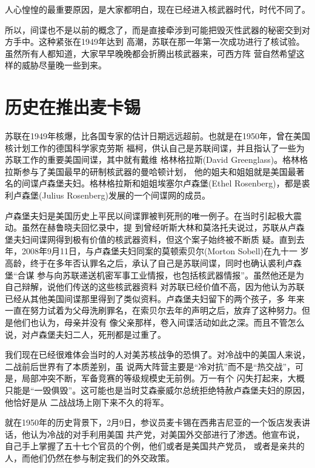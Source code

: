 \documentclass[10pt]{article}
\begin{document}
{人心惶惶的最重要原因，是大家都明白，现在已经进入核武器时代，时代不同了。

所以，间谍也不是以前的概念了，而是直接牵涉到可能把毁灭性武器的秘密交到对方手中。这种紧张在1949年达到
高潮，苏联在那一年第一次成功进行了核试验。虽然所有人都知道，大家早早晚晚都会折腾出核武器来，可西方阵
营自然希望这样的威胁尽量晚一些到来。

\pagebreak
\section{历史在推出麦卡锡}

苏联在1949年核爆，比各国专家的估计日期远远超前。也就是在1950年，曾在美国核计划工作的德国科学家克劳斯
\textperiodcentered 福柯，供认自己是苏联间谍，并且指认了一些为苏联工作的重要美国间谍，其中就有戴维
\textperiodcentered 格林格拉斯(David Greenglass)。格林格拉斯参与了美国最早的研制核武器的曼哈顿计划，
他的姐夫和姐姐就是美国最著名的间谍卢森堡夫妇。格林格拉斯和姐姐埃塞尔\textperiodcentered 卢森堡(Ethel
Rosenberg)，都是裘利\textperiodcentered 卢森堡(Julius Rosenberg)发展的一个间谍网的成员。

卢森堡夫妇是美国历史上平民以间谍罪被判死刑的唯一例子。在当时引起极大震动。虽然在赫鲁晓夫回忆录中，提
到曾经听斯大林和莫洛托夫说过，苏联从卢森堡夫妇间谍网得到极有价值的核武器资料，但这个案子始终被不断质
疑。直到去年，2008年9月11日，与卢森堡夫妇同案的莫顿\textperiodcentered 索贝尔(Morton Sobell)在九十一
岁高龄，终于在多年否认罪名之后，承认了自己是苏联间谍，同时也确认裘利\textperiodcentered 卢森堡``合谋
参与向苏联递送机密军事工业情报，也包括核武器情报''。虽然他还是为自己辩解，说他们传送的这些核武器资料
对苏联已经价值不高，因为他认为苏联已经从其他美国间谍那里得到了类似资料。卢森堡夫妇留下的两个孩子，多
年来一直在努力试着为父母洗刷罪名，在索贝尔去年的声明之后，放弃了这种努力。但是他们也认为，母亲并没有
像父亲那样，卷入间谍活动如此之深。而且不管怎么说，对卢森堡夫妇二人，死刑都是过重了。

我们现在已经很难体会当时的人对美苏核战争的恐惧了。对冷战中的美国人来说，二战前后世界有了本质差别，虽
说两大阵营主要是``冷对抗''而不是``热交战''，可是，局部冲突不断，军备竞赛的等级规模史无前例。万一有个
闪失打起来，大概只能是``一毁俱毁''。这可能也是当时艾森豪威尔总统拒绝特赦卢森堡夫妇的原因，他恰好是从
二战战场上刚下来不久的将军。

就在1950年的历史背景下，2月9日，参议员麦卡锡在西弗吉尼亚的一个饭店发表讲话，他认为冷战的对手利用美国
共产党，对美国外交部进行了渗透。他宣布说，自己手上掌握了五十七个官员的个例，他们或者是美国共产党员，
或者是亲共的人，而他们仍然在参与制定我们的外交政策。

}
\end{document}

